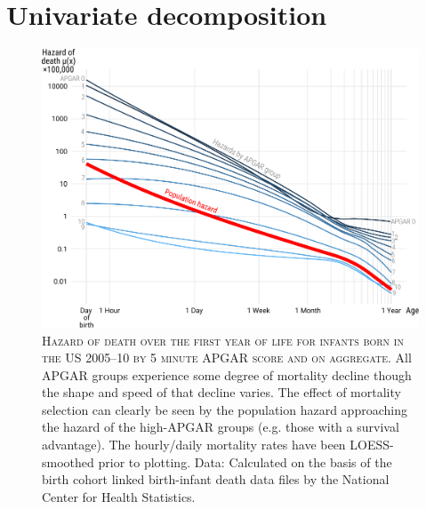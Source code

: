 \documentclass[12pt, parskip=half]{scrartcl}
\begin{document}


\section{Univariate decomposition}

\begin{figure}[!htb]
  \centering
  \includegraphics[width = .9\textwidth]{./fig/plot_ilt_dob0510_apgar5.pdf}
  \caption{\textsc{Hazard of death over the first year of life for infants born in the US 2005--10 by 5 minute APGAR score and on aggregate.} All APGAR groups experience some degree of mortality decline though the shape and speed of that decline varies. The effect of mortality selection can clearly be seen by the population hazard approaching the hazard of the high-APGAR groups (e.g. those with a survival advantage). The hourly/daily mortality rates have been LOESS-smoothed prior to plotting. Data: Calculated on the basis of the birth cohort linked birth-infant death data files by the National Center for Health Statistics.}
  \label{fig:apgar}
\end{figure}
\end{document}
